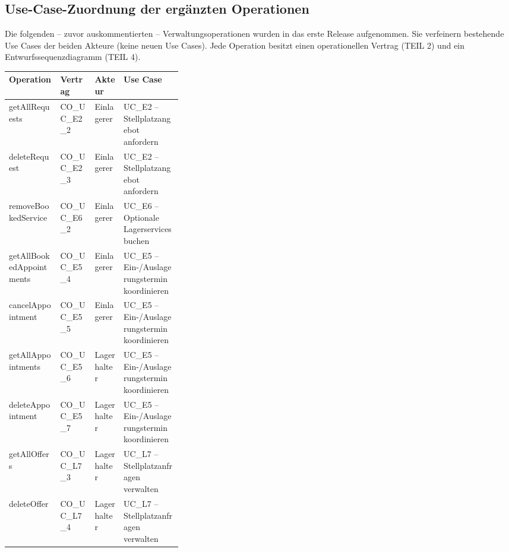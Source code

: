 

{}
\subsection*{Use-Case-Zuordnung der erg\"{a}nzten Operationen}

Die folgenden – zuvor auskommentierten – Verwaltungsoperationen wurden in das
erste Release aufgenommen. Sie verfeinern bestehende Use Cases der beiden Akteure
(keine neuen Use Cases). Jede Operation besitzt einen operationellen Vertrag
(TEIL 2) und ein Entwurfssequenzdiagramm (TEIL 4).

\begin{longtable}{|l|l|l|p{0.34\linewidth}|}
\hline
\rowcolor{tableHeader}
\textbf{Operation} & \textbf{Vertrag} & \textbf{Akteur} & \textbf{Use Case} \\ \hline
\endhead
getAllRequests & CO\_UC\_E2\_2 & Einlagerer & UC\_E2 – Stellplatzangebot anfordern \\ \hline
deleteRequest & CO\_UC\_E2\_3 & Einlagerer & UC\_E2 – Stellplatzangebot anfordern \\ \hline
removeBookedService & CO\_UC\_E6\_2 & Einlagerer & UC\_E6 – Optionale Lagerservices buchen \\ \hline
getAllBookedAppointments & CO\_UC\_E5\_4 & Einlagerer & UC\_E5 – Ein-/Auslagerungstermin koordinieren \\ \hline
cancelAppointment & CO\_UC\_E5\_5 & Einlagerer & UC\_E5 – Ein-/Auslagerungstermin koordinieren \\ \hline
getAllAppointments & CO\_UC\_E5\_6 & Lagerhalter & UC\_E5 – Ein-/Auslagerungstermin koordinieren \\ \hline
deleteAppointment & CO\_UC\_E5\_7 & Lagerhalter & UC\_E5 – Ein-/Auslagerungstermin koordinieren \\ \hline
getAllOffers & CO\_UC\_L7\_3 & Lagerhalter & UC\_L7 – Stellplatzanfragen verwalten \\ \hline
deleteOffer & CO\_UC\_L7\_4 & Lagerhalter & UC\_L7 – Stellplatzanfragen verwalten \\ \hline
\end{longtable}


